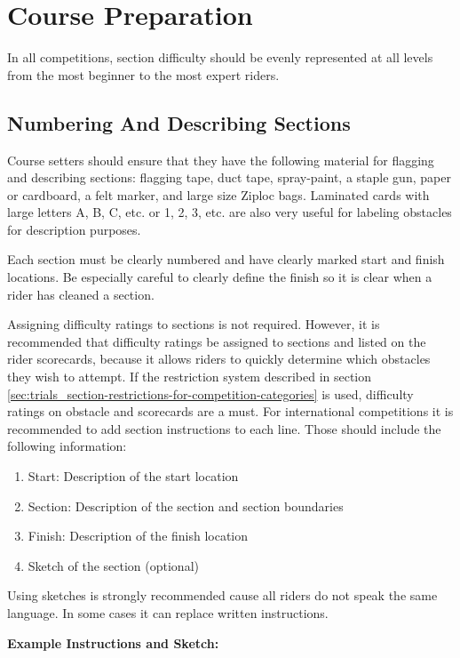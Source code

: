\section{Course Preparation}

In all competitions, section difficulty should be evenly represented at all levels from the most beginner to the most expert riders. 

\subsection{Numbering And Describing Sections \label{sec:trials_guidelines-for-course-setters}}
Course setters should ensure that they have the following material for flagging and describing sections: flagging tape, duct tape, spray-paint, a staple gun, paper or cardboard, a felt marker, and large size Ziploc bags. 
Laminated cards with large letters A, B, C, etc. or 1, 2, 3, etc. are also very useful for labeling obstacles for description purposes.

Each section must be clearly numbered and have clearly marked start and finish locations. 
Be especially careful to clearly define the finish so it is clear when a rider has cleaned a section.

Assigning difficulty ratings to sections is not required. 
However, it is recommended that difficulty ratings be assigned to sections and listed on the rider scorecards, because it allows riders to quickly determine which obstacles they wish to attempt. 
If the restriction system described in section \ref{sec:trials_section-restrictions-for-competition-categories} is used, difficulty ratings on obstacle and scorecards are a must. 
For international competitions it is recommended to add section instructions to each line. 
Those should include the following information:

\begin{enumerate}
\item  Start: Description of the start location
\item Section: Description of the section and section boundaries
\item Finish: Description of the finish location
\item Sketch of the section (optional)
\end{enumerate}
Using sketches is strongly recommended cause all riders do not speak the same language. 
In some cases it can replace written instructions.

\textbf{Example Instructions and Sketch:}


